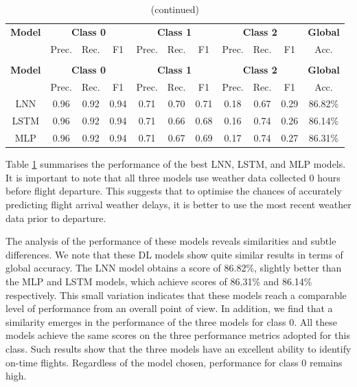 \documentclass[12pt,oneside]{book} %
\begin{document}
\setlength\LTleft{1cm}
\begin{longtable}{ c ccc ccc ccc c}
\caption{\centering Summary table of the performance of the best LNN, LSTM and MLP models} 
\label{comparison1}
\\
\toprule
\textbf{Model} & \multicolumn{3}{c}{\textbf{Class 0}} & \multicolumn{3}{c}{\textbf{Class 1}} & \multicolumn{3}{c}{\textbf{Class 2}} & \multicolumn{1}{c}{\textbf{Global}} \\
               & Prec. & Rec. & F1  & Prec. & Rec. & F1   & Prec. & Rec. & F1  & Acc. \\
\midrule
\endfirsthead

\caption[]{(continued)} \\
\toprule
\textbf{Model} & \multicolumn{3}{c}{\textbf{Class 0}} & \multicolumn{3}{c}{\textbf{Class 1}} & \multicolumn{3}{c}{\textbf{Class 2}} & \multicolumn{1}{c}{\textbf{Global}} \\
               & Prec. & Rec. & F1  & Prec. & Rec. & F1   & Prec. & Rec. & F1  & Acc. \\
\midrule
\endhead

\bottomrule
\endfoot

\bottomrule
\endlastfoot

LNN & 0.96  & 0.92 & 0.94 & 0.71  & 0.70 & 0.71  & 0.18  & 0.67 & 0.29 & 86.82\% 
\\
LSTM & 0.96 & 0.92 & 0.94 & 0.71 & 0.66 & 0.68 & 0.16 & 0.74 & 0.26 & 86.14\%
\\
MLP & 0.96 & 0.92 & 0.94 & 0.71 & 0.67 & 0.69 & 0.17 & 0.74 & 0.27 & 86.31\% 
\\
\end{longtable}

\noindent Table \ref{comparison1} summarises the performance of the best LNN, LSTM, and MLP models. It is important to note that all three models use weather data collected 0 hours before flight departure. This suggests that to optimise the chances of accurately predicting flight arrival weather delays, it is better to use the most recent weather data prior to departure.

\noindent The analysis of the performance of these models reveals similarities and subtle differences. We note that these DL models show quite similar results in terms of global accuracy. The LNN model obtains a score of 86.82\%, slightly better than the MLP and LSTM models, which achieve scores of 86.31\% and 86.14\% respectively. This small variation indicates that these models reach a comparable level of performance from an overall point of view. In addition, we find that a similarity emerges in the performance of the three models for class 0. All these models achieve the same scores on the three performance metrics adopted for this class. Such results show that the three models have an excellent ability to identify on-time flights. Regardless of the model chosen, performance for class 0 remains high.
\end{document}
